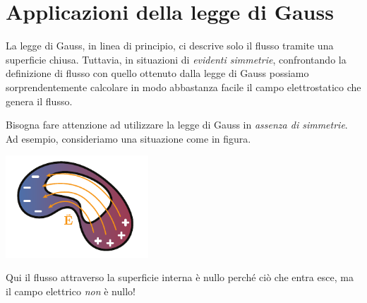 \section{Applicazioni della legge di Gauss}
La legge di Gauss, in linea di principio, ci descrive solo il flusso tramite una superficie chiusa. Tuttavia, in situazioni di \textit{evidenti simmetrie}, confrontando la definizione di flusso con quello ottenuto dalla legge di Gauss possiamo sorprendentemente calcolare in modo abbastanza facile il campo elettrostatico che genera il flusso.
\begin{attention}
	Bisogna fare attenzione ad utilizzare la legge di Gauss in \textit{assenza di simmetrie}. Ad esempio, consideriamo una situazione come in figura.
	\begin{center}
		\includegraphics[width=0.4\textwidth]{images/chp2gaussnosimm.pdf}
	\end{center}
	Qui il flusso attraverso la superficie interna è nullo perché ciò che entra esce, ma il campo elettrico \textit{non} è nullo!
\end{attention}
